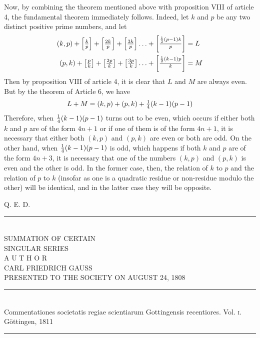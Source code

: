 \documentclass[twoside,12pt]{memoir}
\let\oldfrac\frac
\def\frac#1#2{\mathchoice{\tfrac{#1}{#2}}{\oldfrac{#1}{#2}}{\genfrac{}{}{}{2}{#1}{#2\mathstrut}}{\genfrac{}{}{}{3}{#1}{#2\mathstrut}}}
\begin{document}
Now, by combining the theorem mentioned above with proposition VIII of article 4, the fundamental theorem immediately follows. Indeed, let \(k\) and \(p\) be any two distinct positive prime numbers, and let
\[\begin{aligned}
(k, p)+\left[\frac{k}{p}\right]+\left[\frac{2 k}{p}\right]+\left[\frac{3 k}{p}\right] \ldots+\left[\frac{\frac{1}{2} (p-1) k}{p}\right] &=L\\
(p, k)+\left[\frac{p}{k}\right]+\left[\frac{2 p}{k}\right]+\left[\frac{3 p}{k}\right] \ldots+\left[\frac{\frac{1}{2} (k-1) p}{k}\right] &= M
\end{aligned}\]
Then by proposition VIII of article 4, it is clear that \(L\) and \(M\) are always even. But by the theorem of Article 6, we have
\[L+M=(k, p)+(p, k)+\frac{1}{4}(k-1)(p-1)\]
Therefore, when \(\frac{1}{4}(k-1)(p-1)\) turns out to be even, which occurs if either both \(k\) and \(p\) are of the form \(4n+1\) or if one of them is of the form \(4n+1\), it is necessary that either both \((k, p)\) and \((p, k)\) are even or both are odd. On the other hand, when \(\frac{1}{4}(k-1)(p-1)\) is odd, which happens if both \(k\) and \(p\) are of the form \(4n+3\), it is necessary that one of the numbers \((k, p)\) and \((p, k)\) is even and the other is odd. In the former case, then, the relation of \(k\) to \(p\) and the relation of \(p\) to \(k\) (insofar as one is a quadratic residue or non-residue modulo the other) will be identical, and in the latter case they will be opposite.

\qquad Q. E. D.\\[\baselineskip]
\begin{center}\rule{1.5in}{0.5pt}\end{center}
\pagebreak%

\begin{center}
\;\\
{\large SUMMATION OF CERTAIN }\\[3\baselineskip]
{\LARGE SINGULAR SERIES}\\[5\baselineskip]
{\scriptsize A U T H O R}\\[1.5\baselineskip]
{CARL FRIEDRICH GAUSS}\\[1.5\baselineskip]
{\scriptsize PRESENTED TO THE SOCIETY ON AUGUST 24, 1808}\\[4\baselineskip]
\rule{4in}{0.5pt}\\[0.5\baselineskip]
{\scriptsize Commentationes societatis regiae scientiarum Gottingensis recentiores. Vol. \textsc{i}.\\
Göttingen, \textsc{1811}}\\
\rule{4in}{0.5pt}
\end{center}
\pagebreak%
\;\pagebreak%
\end{document}

